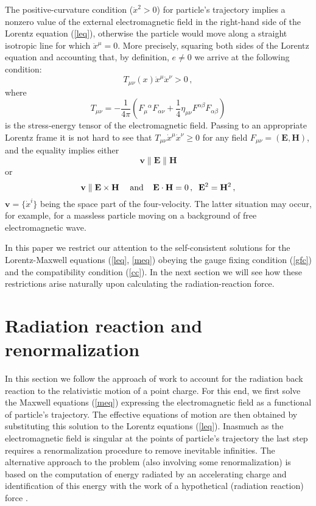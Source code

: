 \documentclass[a4paper,12pt]{article}
\begin{document}
The positive-curvature condition ($\ddot{x}^2>0$) for particle's
trajectory implies a nonzero value of the external electromagnetic
field in the right-hand side of the Lorentz equation (\ref{leq}),
otherwise the particle would move along a straight isotropic line
for which $\ddot{x}^\mu=0$. More precisely, squaring both sides
of the Lorentz equation and accounting that, by definition,
$e\neq 0$ we arrive at the following condition:
\begin{equation}\label{cc}
  T_{\mu\nu}(x)\dot{x}^\mu\dot{x}^\nu > 0\,,
\end{equation}
where
\begin{equation}\label{}
  T_{\mu\nu}=-\frac{1}{4\pi} \left( F_\mu{}^\alpha F_{\alpha\nu} +\frac14\eta_{\mu\nu}
  F^{\alpha\beta}F_{\alpha\beta} \right )
\end{equation}
is the stress-energy tensor of the electromagnetic field. Passing
to an appropriate Lorentz frame it is not hard to see that
$T_{\mu\nu}\dot{x}^\mu\dot{x}^\nu\geq 0$ for any field
$F_{\mu\nu}=(\mathbf{E},\mathbf{H})$, and the equality implies
either
\begin{equation}\label{}
 \mathbf{v}\parallel \mathbf{E}\parallel\mathbf{H}
\end{equation}
or
\begin{equation}\label{}
  \mathbf{v}\parallel \mathbf{E}\times\mathbf{H}\,\;\;\;\;
  {\rm and}\;\;\;\;\mathbf{E}\cdot \mathbf{H}=0\,,\;\;\mathbf{E}^2=\mathbf{H}^2\,,
\end{equation}
$\mathbf{v}=\{\dot{x}^i\}$ being the space part of the
four-velocity. The latter situation may occur, for example, for a
massless particle moving on a background of free electromagnetic
wave.

In this paper we restrict our attention to the self-consistent
solutions for the Lorentz-Maxwell equations (\ref{leq}, \ref{meq})
obeying the gauge fixing condition (\ref{gfc}) and the
compatibility condition (\ref{cc}). In the next section we will
see how these restrictions arise naturally upon calculating the
radiation-reaction force.

\section{Radiation reaction and renormalization}

In this section we follow the approach of work  \cite{KLS} to
account for the radiation back reaction to the relativistic
motion of a point charge. For this end, we first solve the
Maxwell equations (\ref{meq}) expressing the electromagnetic
field as a functional of particle's trajectory. The effective
equations of motion are then obtained by substituting this
solution to the Lorentz equations (\ref{leq}). Inasmuch as the
electromagnetic field is singular at the points of particle's
trajectory the last step requires a renormalization procedure to
remove inevitable infinities. The alternative approach to the
problem (also involving some renormalization) is based on the
computation of energy radiated by an accelerating charge and
identification of this energy with the work of a hypothetical
(radiation reaction) force \cite{Dirac, Kos, TVW, Poisson}.
\end{document}
